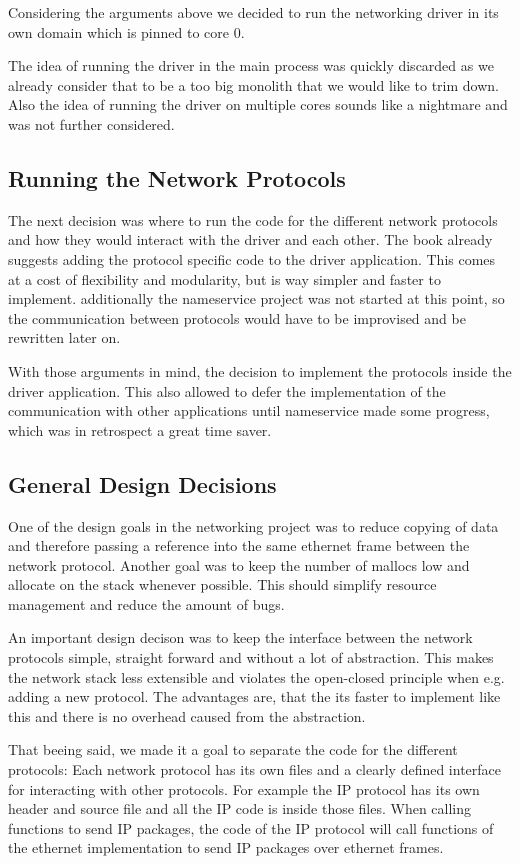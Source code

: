 Considering the arguments above we decided to run the networking driver in its own domain which is pinned to core 0.

The idea of running the driver in the main process was quickly discarded as we already consider that to be a too big monolith that we would like to trim down. Also the idea of running the driver on multiple cores sounds like a nightmare and was not further considered.

\subsection{Running the Network Protocols}

The next decision was where to run the code for the different network protocols and how they would interact with the driver and each other. The book already suggests adding the protocol specific code to the driver application. This comes at a cost of flexibility and modularity, but is way simpler and faster to implement. additionally the nameservice project was not started at this point, so the communication between protocols would have to be improvised and be rewritten later on.

With those arguments in mind, the decision to implement the protocols inside the driver application. This also allowed to defer the implementation of the communication with other applications until nameservice made some progress, which was in retrospect a great time saver.

\subsection{General Design Decisions}

One of the design goals in the networking project was to reduce copying of data and therefore passing a reference into the same ethernet frame between the network protocol. Another goal was to keep the number of mallocs low and allocate on the stack whenever possible. This should simplify resource management and reduce the amount of bugs.

An important design decison was to keep the interface between the network protocols simple, straight forward and without a lot of abstraction. This makes the network stack less extensible and violates the open-closed principle when e.g. adding a new protocol. The advantages are, that the its faster to implement like this and there is no overhead caused from the abstraction.

That beeing said, we made it a goal to separate the code for the different protocols: Each network protocol has its own files and a clearly defined interface for interacting with other protocols. For example the IP protocol has its own header and source file and all the IP code is inside those files. When calling functions to send IP packages, the code of the IP protocol will call functions of the ethernet implementation to send IP packages over ethernet frames.

